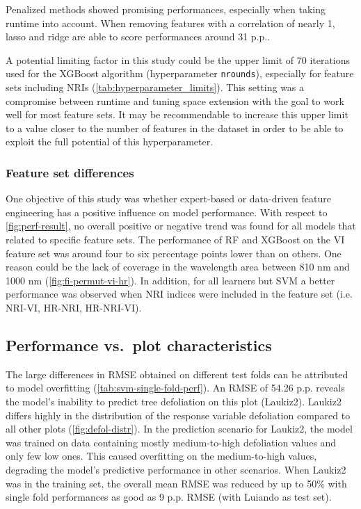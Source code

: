 \documentclass[peerreview]{IEEEtran}
\begin{document}
Penalized methods showed promising performances, especially when taking runtime into account.
When removing features with a correlation of nearly 1, lasso and ridge are able to score performances around 31 p.p..

A potential limiting factor in this study could be the upper limit of 70 iterations used for the XGBoost algorithm (hyperparameter \texttt{nrounds}), especially for feature sets including NRIs (\autoref{tab:hyperparameter_limits}).
This setting was a compromise between runtime and tuning space extension with the goal to work well for most feature sets.
It may be recommendable to increase this upper limit to a value closer to the number of features in the dataset in order to be able to exploit the full potential of this hyperparameter.

\subsubsection{Feature set differences}

One objective of this study was whether expert-based or data-driven feature engineering has a positive influence on model performance.
With respect to \autoref{fig:perf-result}, no overall positive or negative trend was found for all models that related to specific feature sets.
The performance of RF and XGBoost on the VI feature set was around four to six percentage points lower than on others.
One reason could be the lack of coverage in the wavelength area between 810 nm and 1000 nm (\autoref{fig:fi-permut-vi-hr}).
In addition, for all learners but SVM a better performance was observed when NRI indices were included in the feature set (i.e. NRI-VI, HR-NRI, HR-NRI-VI).

\subsection{Performance vs.\ plot characteristics}
\label{subsec:perf-plot-char}

The large differences in RMSE obtained on different test folds can be attributed to model overfitting (\autoref{tab:svm-single-fold-perf}).
An RMSE of 54.26 p.p. reveals the model's inability to predict tree defoliation on this plot (Laukiz2).
Laukiz2 differs highly in the distribution of the response variable defoliation compared to all other plots (\autoref{fig:defol-distr}).
In the prediction scenario for Laukiz2, the model was trained on data containing mostly medium-to-high defoliation values and only few low ones.
This caused overfitting on the medium-to-high values, degrading the model's predictive performance in other scenarios.
When Laukiz2 was in the training set, the overall mean RMSE was reduced by up to 50\% with single fold performances as good as 9 p.p. RMSE (with Luiando as test set).
\end{document}
